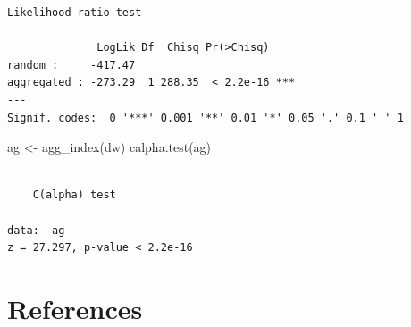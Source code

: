 \documentclass[
  letterpaper,
  DIV=11,
  numbers=noendperiod]{scrreprt}
\newenvironment{Shaded}{\begin{snugshade}}{\end{snugshade}}
\newcommand{\FunctionTok}[1]{\textcolor[rgb]{0.28,0.35,0.67}{#1}}
\newcommand{\NormalTok}[1]{\textcolor[rgb]{0.00,0.23,0.31}{#1}}
\newcommand{\OtherTok}[1]{\textcolor[rgb]{0.00,0.23,0.31}{#1}}
\newcommand{\SpecialCharTok}[1]{\textcolor[rgb]{0.37,0.37,0.37}{#1}}
\begin{document}
\begin{Shaded}
\end{Shaded}

\begin{verbatim}
Likelihood ratio test

              LogLik Df  Chisq Pr(>Chisq)    
random :     -417.47                         
aggregated : -273.29  1 288.35  < 2.2e-16 ***
---
Signif. codes:  0 '***' 0.001 '**' 0.01 '*' 0.05 '.' 0.1 ' ' 1
\end{verbatim}

\begin{Shaded}
\begin{Highlighting}[]
\NormalTok{ag }\OtherTok{\textless{}{-}} \FunctionTok{agg\_index}\NormalTok{(dw)}
\FunctionTok{calpha.test}\NormalTok{(ag)}
\end{Highlighting}
\end{Shaded}

\begin{verbatim}

    C(alpha) test

data:  ag
z = 27.297, p-value < 2.2e-16
\end{verbatim}


\hypertarget{references}{%
\chapter*{References}\label{references}}
\end{document}
